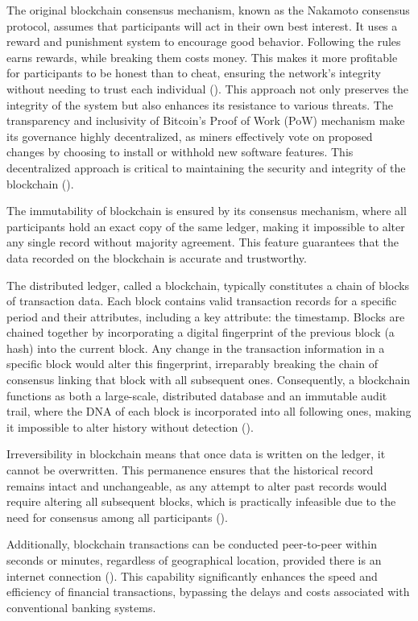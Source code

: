 \documentclass[twocolumn]{article}
\begin{document}
The original blockchain consensus mechanism, known as the Nakamoto consensus protocol, assumes that participants will act in their own best interest. It uses a reward and punishment system to encourage good behavior. Following the rules earns rewards, while breaking them costs money. This makes it more profitable for participants to be honest than to cheat, ensuring the network's integrity without needing to trust each individual (\cite{wang_survey_2019}). This approach not only preserves the integrity of the system but also enhances its resistance to various threats. The transparency and inclusivity of Bitcoin's Proof of Work (PoW) mechanism make its governance highly decentralized, as miners effectively vote on proposed changes by choosing to install or withhold new software features. This decentralized approach is critical to maintaining the security and integrity of the blockchain (\cite{rochard_bitcoin_2020}).

The immutability of blockchain is ensured by its consensus mechanism, where all participants hold an exact copy of the same ledger, making it impossible to alter any single record without majority agreement. This feature guarantees that the data recorded on the blockchain is accurate and trustworthy. 

The distributed ledger, called a blockchain, typically constitutes a chain of blocks of transaction data. Each block contains valid transaction records for a specific period and their attributes, including a key attribute: the timestamp. Blocks are chained together by incorporating a digital fingerprint of the previous block (a hash) into the current block. Any change in the transaction information in a specific block would alter this fingerprint, irreparably breaking the chain of consensus linking that block with all subsequent ones. Consequently, a blockchain functions as both a large-scale, distributed database and an immutable audit trail, where the DNA of each block is incorporated into all following ones, making it impossible to alter history without detection (\cite{catalini_simple_2019}).

Irreversibility in blockchain means that once data is written on the ledger, it cannot be overwritten. This permanence ensures that the historical record remains intact and unchangeable, as any attempt to alter past records would require altering all subsequent blocks, which is practically infeasible due to the need for consensus among all participants (\cite{maurer_when_2013}).

Additionally, blockchain transactions can be conducted peer-to-peer within seconds or minutes, regardless of geographical location, provided there is an internet connection (\cite{wust_you_2018}). This capability significantly enhances the speed and efficiency of financial transactions, bypassing the delays and costs associated with conventional banking systems. 
\end{document}

